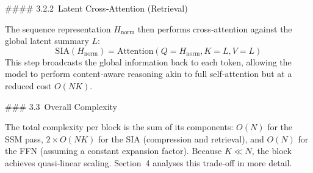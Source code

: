 \documentclass[10pt,twocolumn,letterpaper]{article}
\begin{document}
#### 3.2.2 Latent Cross‑Attention (Retrieval)

The sequence representation $H_{\text{norm}}$ then performs cross‑attention against the global latent summary $L$:
\begin{equation}
\mathrm{SIA}(H_{\text{norm}}) = \mathrm{Attention}(Q=H_{\text{norm}}, K=L, V=L)
\end{equation}
This step broadcasts the global information back to each token, allowing the model to perform content‑aware reasoning akin to full self‑attention but at a reduced cost $O(NK)$.

### 3.3 Overall Complexity

The total complexity per block is the sum of its components: $O(N)$ for the SSM pass, $2\times O(NK)$ for the SIA (compression and retrieval), and $O(N)$ for the FFN (assuming a constant expansion factor).  Because $K\ll N$, the block achieves quasi‑linear scaling.  Section 4 analyses this trade‑off in more detail.
\end{document}
